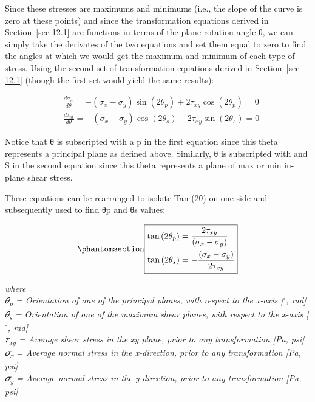 \documentclass[
  letterpaper,
  DIV=11,
  numbers=noendperiod]{scrreprt}
\theoremstyle{definition}
\theoremstyle{remark}
\begin{document}
Since these stresses are maximums and minimums (i.e., the slope of the
curve is zero at these points) and since the transformation equations
derived in Section~\ref{sec-12.1} are functions in terms of the plane
rotation angle θ, we can simply take the derivates of the two equations
and set them equal to zero to find the angles at which we would get the
maximum and minimum of each type of stress. Using the second set of
transformation equations derived in Section~\ref{sec-12.1} (though the
first set would yield the same results):

\[
\begin{aligned}
& \frac{d \sigma_n}{d \theta}=-\left(\sigma_x-\sigma_y\right) \sin \left(2 \theta_p\right)+2 \tau_{x y} \cos \left(2 \theta_p\right)=0 \\
& \frac{d \tau_{n t}}{d \theta}=-\left(\sigma_x-\sigma_y\right) \cos \left(2 \theta_s\right)-2 \tau_{x y} \sin \left(2 \theta_s\right)=0
\end{aligned}
\]

Notice that θ is subscripted with a p in the first equation since this
theta represents a principal plane as defined above. Similarly, θ is
subscripted with and S in the second equation since this theta
represents a plane of max or min in-plane shear stress.

These equations can be rearranged to isolate Tan (2θ) on one side and
subsequently used to find θp and θs values:

\begin{equation}\phantomsection\label{eq-12.2}{
\boxed{\begin{aligned}
\tan \left(2 \theta_p\right) & =\frac{2 \tau_{x y}}{\left(\sigma_x-\sigma_y\right)} \\
\tan \left(2 \theta_s\right) & =-\frac{\left(\sigma_x-\sigma_y\right)}{2 \tau_{x y}}
\end{aligned}}
}\end{equation}

\emph{where}\\
\emph{𝜃\textsubscript{p} = Orientation of one of the principal planes,
with respect to the x-axis {[}}\(^\circ\)\emph{, rad{]}}\\
\emph{𝜃\textsubscript{s} = Orientation of one of the maximum shear
planes, with respect to the x-axis {[}}\(^\circ\)\emph{, rad{]}}\\
\emph{𝜏\textsubscript{xy} = Average shear stress in the xy plane, prior
to any transformation {[}Pa, psi{]}}\\
\emph{𝜎\textsubscript{x} = Average normal stress in the x-direction,
prior to any transformation {[}Pa, psi{]}}\\
\emph{𝜎\textsubscript{y} = Average normal stress in the y-direction,
prior to any transformation {[}Pa, psi{]}}
\end{document}
